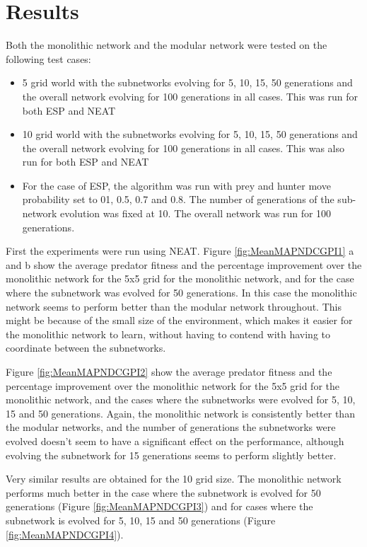 \section{Results}
Both the monolithic network and the modular network were tested on the following test cases:
\begin{itemize}
\item 5  grid world with the subnetworks evolving for 5, 10, 15, 50 generations and the overall network evolving for 100 generations in all cases. This was run for both ESP and NEAT
\item 10  grid world with the subnetworks evolving for 5, 10, 15, 50 generations and the overall network evolving for 100 generations in all cases. This was also run for both ESP and NEAT
\item For the case of ESP, the algorithm was run with prey and hunter move probability set to 01, 0.5, 0.7 and 0.8. The number of generations of the sub-network evolution was fixed at 10. The overall network was run for 100 generations. 
\end{itemize}

First the experiments were run using NEAT.
Figure \ref{fig:MeanMAPNDCGPI1} a and b show the average predator fitness and the percentage improvement over the monolithic network for the 5x5 grid for the monolithic network, and for the case where the subnetwork was evolved for 50 generations. In this case the monolithic network seems to perform better than the modular network throughout. This might be because of the small size of the environment, which makes it easier for the monolithic network to learn, without having to contend with having to coordinate between the subnetworks. 

Figure \ref{fig:MeanMAPNDCGPI2} show the average predator fitness and the percentage improvement over the monolithic network for the 5x5 grid for the monolithic network, and the cases where the subnetworks were evolved for 5, 10, 15 and 50 generations. Again, the monolithic network is consistently better than the modular networks, and the number of generations the subnetworks were evolved doesn't seem to have a significant effect on the performance, although evolving the subnetwork for 15 generations seems to perform slightly better.

Very similar results are obtained for the 10  grid size. The monolithic network performs much better in the case where the subnetwork is evolved for 50 generations (Figure \ref{fig:MeanMAPNDCGPI3}) and for cases where the subnetwork is evolved for 5, 10, 15 and 50 generations (Figure \ref{fig:MeanMAPNDCGPI4}).  


